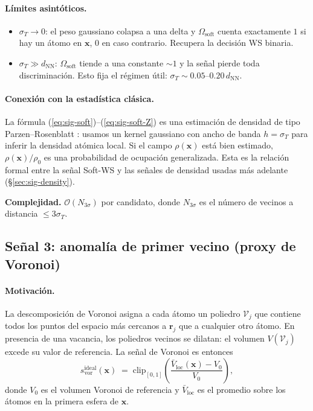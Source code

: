 \documentclass[11pt,a4paper]{article}
\theoremstyle{remark}
\begin{document}
\paragraph{Límites asintóticos.}
\begin{itemize}
\item $\sigma_T \to 0$: el peso gaussiano colapsa a una delta y $\Omega_\text{soft}$
      cuenta exactamente $1$ si hay un átomo en $\mathbf{x}$, $0$ en caso
      contrario. Recupera la decisión WS binaria.
\item $\sigma_T \gg d_\text{NN}$: $\Omega_\text{soft}$ tiende a una constante
      $\sim 1$ y la señal pierde toda discriminación. Esto fija el
      régimen útil: $\sigma_T \sim 0.05\text{--}0.20\,d_\text{NN}$.
\end{itemize}

\paragraph{Conexión con la estadística clásica.} La fórmula
(\ref{eq:sig-soft})--(\ref{eq:sig-soft-Z}) es una estimación de densidad
de tipo Parzen--Rosenblatt \cite{Silverman1986}: usamos un kernel
gaussiano con ancho de banda $h = \sigma_T$ para inferir la
densidad atómica local. Si el campo $\rho(\mathbf{x})$ está bien
estimado, $\rho(\mathbf{x})/\rho_0$ es una probabilidad de ocupación
generalizada. Esta es la relación formal entre la señal Soft-WS y las
señales de densidad usadas más adelante (\S\ref{sec:sig-density}).

\textbf{Complejidad.} $\mathcal{O}(N_{3\sigma})$ por candidato, donde
$N_{3\sigma}$ es el número de vecinos a distancia $\leq 3\sigma_T$.

\subsection{Señal 3: anomalía de primer vecino (proxy de Voronoi)}
\label{sec:sig-voronoi}

\paragraph{Motivación.} La descomposición de Voronoi
\cite{Stukowski2010,Brostow1978} asigna a cada átomo un poliedro
$\mathcal{V}_j$ que contiene todos los puntos del espacio más
cercanos a $\mathbf{r}_j$ que a cualquier otro átomo. En presencia de
una vacancia, los poliedros vecinos se dilatan: el volumen
$V(\mathcal{V}_j)$ excede su valor de referencia. La señal de Voronoi
es entonces
\begin{equation}
  s_\text{vor}^\text{ideal}(\mathbf{x}) \;=\; \mathrm{clip}_{[0,1]}\!\left(
  \frac{\bar V_\text{loc}(\mathbf{x}) - V_0}{V_0} \right),
\end{equation}
donde $V_0$ es el volumen Voronoi de referencia y $\bar V_\text{loc}$
es el promedio sobre los átomos en la primera esfera de $\mathbf{x}$.
\end{document}
